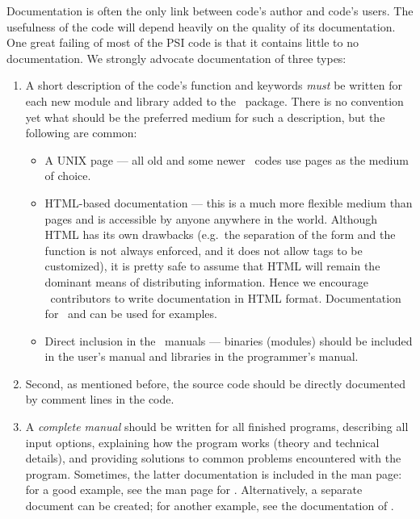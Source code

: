 Documentation is often the only link between code's author and code's
users. The usefulness of the code will depend heavily on the quality
of its documentation.  One great failing of most of the PSI code is
that it contains little to no documentation.  We strongly advocate
documentation of three types:
\begin{enumerate}
\item A short description of the code's function and keywords {\em must} be written
for each new module and library added to the \PSIthree\ package.
There is no convention yet what should be the preferred medium for
such a description, but the following are common:
\begin{itemize}
\item A UNIX  page --- all old and some newer \PSIthree\ codes
use  pages as the medium of choice.

\item HTML-based documentation --- this is a much more flexible medium
than  pages and is accessible by anyone anywhere in the
world.  Although HTML has its own drawbacks (e.g.\ the separation of the
form and the function is not always enforced, and it does not allow
tags to be customized), it is pretty safe to assume that HTML will
remain the dominant means of distributing information.  Hence we
encourage \PSIthree\ contributors to write documentation in HTML
format. Documentation for \PSIcints\ and  can be
used for examples.

\item Direct inclusion in the \PSIthree\ manuals --- binaries
(modules) should be included in the user's manual and libraries in the
programmer's manual.
\end{itemize}

\item Second, as mentioned before, the source code should be directly
documented by comment lines in the code.

\item A {\em complete manual} should be written for all finished programs,
describing all input options, explaining how the program works (theory and 
technical details), and providing solutions to common problems encountered
with the program.  Sometimes, the latter documentation is included in the
man page: for a good example, see the man page for .  
Alternatively, a separate document can be created; for another example,
see the documentation of .
\end{enumerate}
